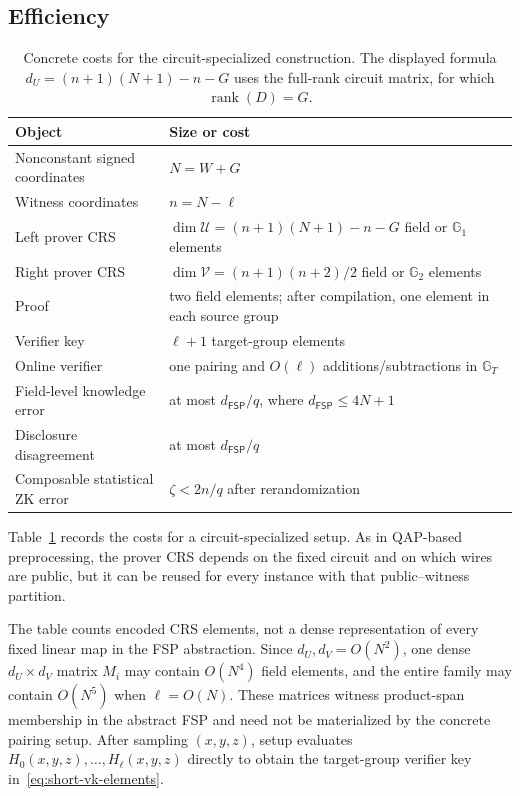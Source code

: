 \documentclass[11pt]{article}
\theoremstyle{definition}
\newcommand{\Gone}{\mathbb G_1}
\newcommand{\Gtwo}{\mathbb G_2}
\newcommand{\GT}{\mathbb G_T}
\newcommand{\cU}{\mathcal U}
\newcommand{\cV}{\mathcal V}
\newcommand{\FSP}{\mathsf{FSP}}
\begin{document}
\subsection{Efficiency}

\begin{table}[t]
\centering
\begin{tabularx}{0.94\textwidth}{@{}lX@{}}
\toprule
Object & Size or cost \\
\midrule
Nonconstant signed coordinates & $N=W+G$ \\
Witness coordinates & $n=N-\ell$ \\
Left prover CRS & $\dim\cU=(n+1)(N+1)-n-G$ field or $\Gone$ elements \\
Right prover CRS & $\dim\cV=(n+1)(n+2)/2$ field or $\Gtwo$ elements \\
Proof & two field elements; after compilation, one element in each source group \\
Verifier key & $\ell+1$ target-group elements \\
Online verifier & one pairing and $O(\ell)$ additions/subtractions in $\GT$ \\
Field-level knowledge error & at most $d_{\FSP}/q$, where $d_{\FSP}\le4N+1$ \\
Disclosure disagreement & at most $d_{\FSP}/q$ \\
Composable statistical ZK error & $\zeta<2n/q$ after rerandomization \\
\bottomrule
\end{tabularx}
\caption{Concrete costs for the circuit-specialized construction.  The
displayed formula $d_U=(n+1)(N+1)-n-G$ uses the full-rank circuit matrix,
for which $\operatorname{rank}(D)=G$.}
\label{tab:efficiency}
\end{table}

Table~\ref{tab:efficiency} records the costs for a circuit-specialized setup.  As in QAP-based
preprocessing, the prover CRS depends on the fixed circuit and on which wires
are public, but it can be reused for every instance with that public--witness
partition.  

The table counts encoded CRS elements, not a dense representation of every
fixed linear map in the FSP abstraction.  Since $d_U,d_V=O(N^2)$, one dense
$d_U\times d_V$ matrix $M_i$ may contain $O(N^4)$ field elements, and the
entire family may contain $O(N^5)$ when $\ell=O(N)$.  These matrices witness
product-span membership in the abstract FSP and need not be materialized by
the concrete pairing setup.  After sampling $(x,y,z)$, setup evaluates
$H_0(x,y,z),\ldots,H_\ell(x,y,z)$ directly to obtain the target-group verifier
key in~\eqref{eq:short-vk-elements}.
\end{document}
